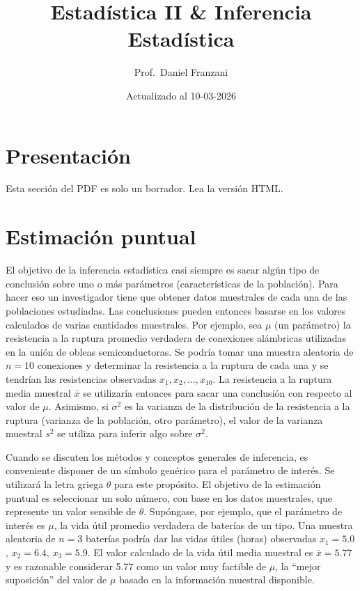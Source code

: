 \documentclass[
  11pt,
]{book}
\title{Estadística II \& Inferencia Estadística}
\author{Prof.~Daniel Franzani}
\date{Actualizado al 10-03-2026}
\theoremstyle{definition}
\theoremstyle{definition}
\theoremstyle{definition}
\theoremstyle{definition}
\theoremstyle{remark}
\begin{document}
\maketitle

{
\hypersetup{linkcolor=}
\setcounter{tocdepth}{3}
\tableofcontents
}
\chapter*{Presentación}\label{presentacion}

Esta sección del PDF es solo un borrador. Lea la versión HTML.

\chapter{Estimación puntual}\label{estimacion-puntual}

El objetivo de la inferencia estadística casi siempre es sacar algún tipo de conclusión sobre uno o más parámetros (características de la población). Para hacer eso un investigador tiene que obtener datos muestrales de cada una de las poblaciones estudiadas. Las conclusiones pueden entonces basarse en los valores calculados de varias cantidades muestrales. Por ejemplo, sea \(\mu\) (un parámetro) la resistencia a la ruptura promedio verdadera de conexiones alámbricas utilizadas en la unión de obleas semiconductoras. Se podría tomar una muestra aleatoria de \(n = 10\) conexiones y determinar la resistencia a la ruptura de cada una y se tendrían las resistencias observadas \(x_1, x_2, \ldots, x_{10}\). La resistencia a la ruptura media muestral \(\bar{x}\) se utilizaría entonces para sacar una conclusión con respecto al valor de \(\mu\). Asimismo, si \(\sigma^2\) es la varianza de la distribución de la resistencia a la ruptura (varianza de la población, otro parámetro), el valor de la varianza muestral \(s^2\) se utiliza para inferir algo sobre \(\sigma^2\). \citep[página 228]{Devore}

Cuando se discuten los métodos y conceptos generales de inferencia, es conveniente disponer de un símbolo genérico para el parámetro de interés. Se utilizará la letra griega \(\theta\) para este propósito. El objetivo de la estimación puntual es seleccionar un solo número, con base en los datos muestrales, que represente un valor sensible de \(\theta\). Supóngase, por ejemplo, que el parámetro de interés es \(\mu\), la vida útil promedio verdadera de baterías de un tipo. Una muestra aleatoria de \(n = 3\) baterías podría dar las vidas útiles (horas) observadas \(x_1 = 5.0\), \(x_2 = 6.4\), \(x_3 = 5.9\). El valor calculado de la vida útil media muestral es \(\bar{x} = 5.77\) y es razonable considerar 5.77 como un valor muy factible de \(\mu\), la ``mejor suposición'' del valor de \(\mu\) basado en la información muestral disponible.
\end{document}
